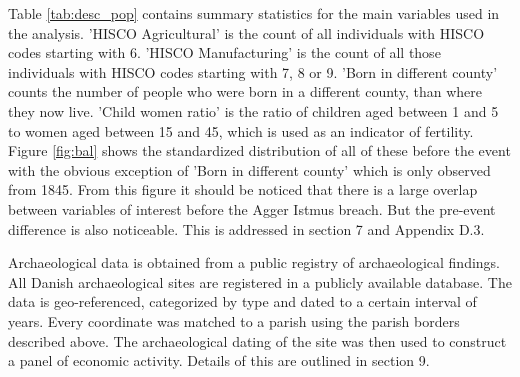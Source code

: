 \documentclass[11pt]{article}
\begin{document}
Table \ref{tab:desc_pop} contains summary statistics for the main variables used in the analysis. 'HISCO Agricultural' is the count of all individuals with HISCO codes starting with 6. 'HISCO Manufacturing' is the count of all those individuals with HISCO codes starting with 7, 8 or 9. 'Born in different county' counts the number of people who were born in a different county, than where they now live. 'Child women ratio' is the ratio of children aged between 1 and 5 to women aged between 15 and 45, which is used as an indicator of fertility. Figure \ref{fig:bal} shows the standardized distribution of all of these before the event with the obvious exception of 'Born in different county' which is only observed from 1845. From this figure it should be noticed that there is a large overlap between variables of interest before the Agger Istmus breach. But the pre-event difference is also noticeable. This is addressed in section 7 and Appendix D.3. 

Archaeological data is obtained from a public registry of archaeological findings. All Danish archaeological sites are registered in a publicly available database. The data is geo-referenced, categorized by type and dated to a certain interval of years. Every coordinate was matched to a parish using the parish borders described above. The archaeological dating of the site was then used to construct a panel of economic activity. Details of this are outlined in section 9.
\end{document}
